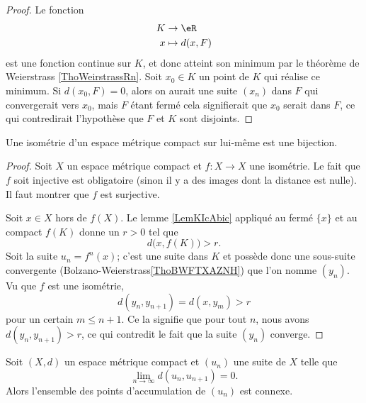 \begin{proof}
    Le fonction 
    \begin{equation}
        \begin{aligned}
             K&\to \eR \\
            x&\mapsto d(x,F) 
        \end{aligned}
    \end{equation}
    est une fonction continue sur \( K\), et donc atteint son minimum par le théorème de Weierstrass \ref{ThoWeirstrassRn}. Soit \( x_0\in K\) un point de \( K\) qui réalise ce minimum. Si \( d(x_0,F)=0\), alors on aurait une suite \( (x_n)\) dans \( F\) qui convergerait vers \( x_0\), mais \( F\) étant fermé cela signifierait que \( x_0\) serait dans \( F\), ce qui contredirait l'hypothèse que \( F\) et \( K\) sont disjoints.
\end{proof}

\begin{proposition}
    Une isométrie d'un espace métrique compact sur lui-même est une bijection.
\end{proposition}

\begin{proof}
    Soit \( X\) un espace métrique compact et \( f\colon X\to X\) une isométrie. Le fait que \( f\) soit injective est obligatoire (sinon il y a des images dont la distance est nulle). Il faut montrer que \( f\) est surjective.

    Soit \( x\in X\) hors de \( f(X)\). Le lemme \ref{LemKIcAbic} appliqué au fermé \( \{ x \}\) et au compact \( f(K)\) donne un \( r>0\) tel que
    \begin{equation}
        d\big( x,f(K)\big)>r.
    \end{equation}
    Soit la suite \( u_n=f^n(x)\); c'est une suite dans \( K\) et possède donc une sous-suite convergente (Bolzano-Weierstrass\ref{ThoBWFTXAZNH}) que l'on nomme \( (y_n)\). Vu que \( f\) est une isométrie,
    \begin{equation}
        d(y_{n},y_{n+1})=d(x,y_m)>r
    \end{equation}
    pour un certain \( m\leq n+1\). Ce la signifie que pour tout \( n\), nous avons \( d(y_n,y_{n+1})>r\), ce qui contredit le fait que la suite \( (y_n)\) converge.
\end{proof}

\begin{proposition} \label{PropLHWACDU}
    Soit \( (X,d)\) un espace métrique compact et \( (u_n)\) une suite de \( X\) telle que
    \begin{equation}
        \lim_{n\to \infty} d(u_n,u_{n+1})=0.
    \end{equation}
    Alors l'ensemble des points d'accumulation de \( (u_n)\) est connexe.
\end{proposition}

